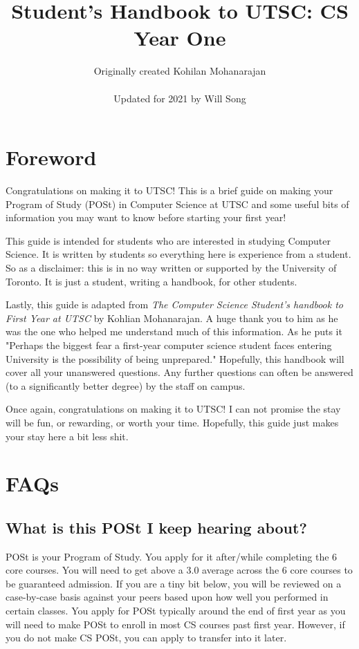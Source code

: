 \documentclass[11pt]{article}
\title{Student's Handbook to UTSC: CS Year One}
\author{Originally created Kohilan Mohanarajan \\ \\ Updated for 2021 by Will Song}
\begin{document}
\maketitle
\newpage
\tableofcontents
\newpage
\section{Foreword}

Congratulations on making it to UTSC! This is a brief guide on making your Program of Study (POSt) in Computer Science at UTSC and some useful bits of information you may want to know before starting your first year!\par
This guide is intended for students who are interested in studying Computer Science. It is written by students so everything here is experience from a student. So as a disclaimer: this is in no way written or supported by the University of Toronto. It is just a student, writing a handbook, for other students. \par
Lastly, this guide is adapted from \textit{The Computer Science Student's handbook to First Year at UTSC} by Kohlian Mohanarajan. A huge thank you to him as he was the one who helped me understand much of this information. As he puts it "Perhaps the biggest fear a first-year computer science student faces entering University is the possibility of being unprepared." Hopefully, this handbook will cover all your unanswered questions. Any further questions can often be answered (to a significantly better degree) by the staff on campus.\par
Once again, congratulations on making it to UTSC! I can not promise the stay will be fun, or rewarding, or worth your time. Hopefully, this guide just makes your stay here a bit less shit.

\section{FAQs}
\subsection{What is this POSt I keep hearing about?} POSt is your Program of Study. You apply for it after/while completing the 6 core courses. You will need to get above a 3.0 average across the 6 core courses to be guaranteed admission. If you are a tiny bit below, you will be reviewed on a case-by-case basis against your peers based upon how well you performed in certain classes. You apply for POSt typically around the end of first year as you will need to make POSt to enroll in most CS courses past first year. However, if you do not make CS POSt, you can apply to transfer into it later.\par
\end{document}
